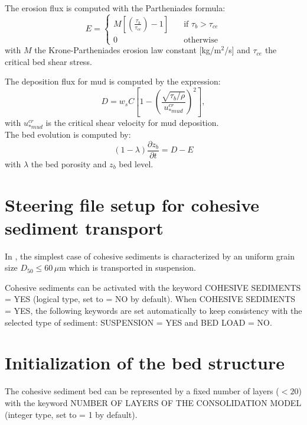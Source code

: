 The erosion flux is computed with the Partheniades formula:
\begin{equation*}
E = \left\{\begin{array}{ll}
M\left[\left(\frac{\tau_b}{\tau_{ce}}\right)-1\right]\quad & \text{if}\,\,\tau_b> \tau_{ce}\\  
0\quad & \text{otherwise}
\end{array}
\right. 
\end{equation*}
with $M$ the Krone-Partheniades erosion law constant [kg/m$^2$/s] and $\tau_{ce}$ the critical bed shear stress.

The deposition flux for mud is computed by the expression:
\begin{equation}
D = w_{s} C \left[1-\left(\frac{\sqrt{\tau_b/\rho}}{u_{*mud}^{cr}}\right)^2 \right],
\end{equation}
with $u_{*mud}^{cr}$ is the critical shear velocity for mud deposition.\\

The bed evolution is computed by:
\begin{equation*}
(1-\lambda)\frac{\partial z_b}{\partial t} = D - E
\end{equation*}
with $\lambda$ the bed porosity and $z_b$ bed level.

\section{Steering file setup for cohesive sediment transport}
In \sisyphe{}, the simplest case of cohesive sediments
is characterized by an uniform grain size $D_{50}\leq 60\,\mu$m which is
transported in suspension.

Cohesive sediments can be activated with the keyword {\ttfamily COHESIVE SEDIMENTS = YES} (logical type, set to {\ttfamily = NO} by default). When {\ttfamily COHESIVE SEDIMENTS = YES}, the following keywords are set automatically to keep consistency with the selected type of sediment: {\ttfamily SUSPENSION = YES} and {\ttfamily BED LOAD = NO}.


\section{Initialization of the bed structure}
The cohesive sediment bed can be represented by a fixed number of layers ($<20$) with the keyword {\ttfamily NUMBER OF LAYERS OF THE CONSOLIDATION MODEL} (integer type, set to {\ttfamily = 1} by default).

